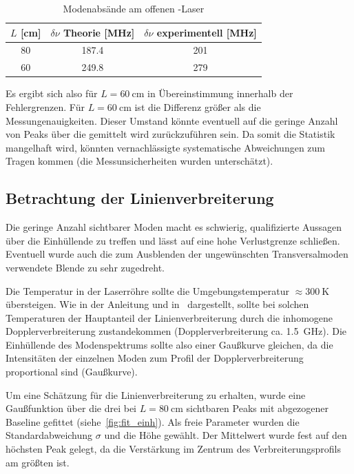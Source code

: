 \documentclass[slug=GL, room=HZDR\ Dresden/Rossendorf\,\ Geb.\ 620/123, supervisor=Tim\ Ziegler]{../../Lab_Report_LaTeX/lab_report}
\newcommand{\hne}{\ce{HeNe}-Laser}
\begin{document}
\begin{table}[H]
  \centering
  \begin{tabular}{SSS}
    \toprule
    {\(L\) [\si{\centi\meter}]} & {\(\delta\nu\) Theorie [\si{\mega\hertz}]} & {\(\delta\nu\) experimentell [\si{\mega\hertz}]}\\
     & 187.4 & 201 \\
    60 & 249.8 & 279 \\
    \bottomrule
  \end{tabular}
  \caption{Modenabs\"ande am offenen \hne{}}
  \label{tab:longmodstruk}
\end{table}

Es ergibt sich also f\"ur \(L=\SI{60}{\centi\meter}\) in
\"Ubereinstimmung innerhalb der Fehlergrenzen. F\"ur
\(L=\SI{60}{\centi\meter}\) ist die Differenz gr\"o\ss{}er als die
Messungenauigkeiten. Dieser Umstand k\"onnte eventuell auf die geringe
Anzahl von Peaks \"uber die gemittelt wird zur\"uckzuf\"uhren sein. Da
somit die Statistik mangelhaft wird, k\"onnten vernachl\"assigte
systematische Abweichungen zum Tragen kommen (die Messunsicherheiten
wurden untersch\"atzt).

\subsection{Betrachtung der Linienverbreiterung}
\label{sec:linver}

Die geringe Anzahl sichtbarer Moden macht es schwierig, qualifizierte
Aussagen \"uber die Einh\"ullende zu treffen und l\"asst auf eine hohe Verlustgrenze
schlie\ss{}en. Eventuell wurde auch die zum Ausblenden der
ungew\"unschten Transversalmoden verwendete Blende zu sehr zugedreht.

Die Temperatur in der Laserr\"ohre sollte die Umgebungstemperatur
\(\approx \SI{300}{\kelvin}\) \"ubersteigen. Wie in der Anleitung und
in~\cite[60]{Sigrist2018} dargestellt, sollte bei solchen Temperaturen
der Hauptanteil der Linienverbreiterung durch die inhomogene
Dopplerverbreiterung zustandekommen (Dopplerverbreiterung
ca. \SI{1.5}{\giga\hertz}). Die Einh\"ullende des Modenspektrums
sollte also einer Gaußkurve gleichen, da die Intensit\"aten der
einzelnen Moden zum Profil der Dopplerverbreiterung proportional sind
(Gau\ss{}kurve).

Um eine Schätzung f\"ur die Linienverbreiterung zu erhalten, wurde
eine Gaußfunktion \"uber die drei bei \(L=\SI{80}{\centi\meter}\)
sichtbaren Peaks mit abgezogener Baseline gefittet
(siehe~\ref{fig:fit_einh}). Als freie Parameter wurden die
Standardabweichung \(\sigma\) und die H\"ohe gew\"ahlt. Der
Mittelwert wurde fest auf den h\"ochsten Peak gelegt, da die
Verst\"arkung im Zentrum des Verbreiterungsprofils am gr\"o\ss{}ten
ist.
\end{document}
